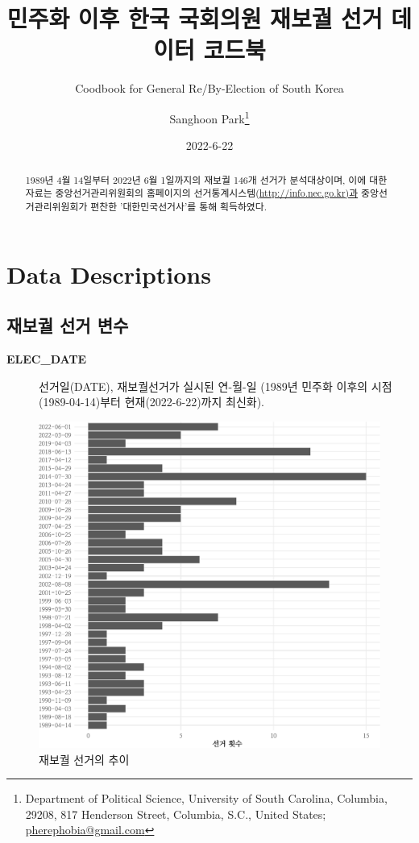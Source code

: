 \documentclass[
  11pt,
  letter]{article}
\title{\Large \bf 민주화 이후 한국 국회의원 재보궐 선거 데이터 코드북}
\subtitle{\large Coodbook for General Re/By-Election of South Korea}
\author{Sanghoon Park\footnote{Department of Political Science,
  University of South Carolina, Columbia, 29208, 817 Henderson Street,
  Columbia, S.C., United States; \url{pherephobia@gmail.com}}}
\date{2022-6-22}
\begin{document}
\maketitle
\begin{abstract}
\noindent 1989년 4월 14일부터 2022년 6월 1일까지의 재보궐 146개 선거가
분석대상이며, 이에 대한 자료는 중앙선거관리위원회의 홈페이지의
선거통계시스템(\url{http://info.nec.go.kr)과} 중앙선거관리위원회가
편찬한 '대한민국선거사'를 통해 획득하였다.
\end{abstract}

{
\setcounter{tocdepth}{3}
\tableofcontents
}
\clearpage
\newpage

\hypertarget{data-descriptions}{%
\section{Data Descriptions}\label{data-descriptions}}

\hypertarget{uxc7acuxbcf4uxad90-uxc120uxac70-uxbcc0uxc218}{%
\subsection{재보궐 선거
변수}\label{uxc7acuxbcf4uxad90-uxc120uxac70-uxbcc0uxc218}}

\begin{description}
\item[\textbf{ELEC\_DATE}]
선거일(DATE), 재보궐선거가 실시된 연-월-일 (1989년 민주화 이후의
시점(1989-04-14)부터 현재(2022-6-22)까지 최신화).
\end{description}

\begin{figure}
\centering
\includegraphics{Codebook_national_files/figure-latex/unnamed-chunk-1-1.pdf}
\caption{재보궐 선거의 추이}
\end{figure}
\end{document}
